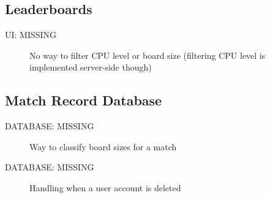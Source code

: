 \documentclass{article}
\begin{document}
\subsection{Leaderboards}

\begin{description}
  \item[UI: MISSING] No way to filter CPU level or board size (filtering CPU level is implemented server-side though)
\end{description}

\subsection{Match Record Database}

\begin{description}
  \item[DATABASE: MISSING] Way to classify board sizes for a match
  \item[DATABASE: MISSING] Handling when a user account is deleted
\end{description}
\end{document}
